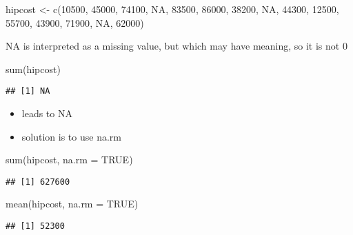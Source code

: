\documentclass[
]{book}
\newenvironment{Shaded}{\begin{snugshade}}{\end{snugshade}}
\newcommand{\AttributeTok}[1]{\textcolor[rgb]{0.77,0.63,0.00}{#1}}
\newcommand{\ConstantTok}[1]{\textcolor[rgb]{0.00,0.00,0.00}{#1}}
\newcommand{\DecValTok}[1]{\textcolor[rgb]{0.00,0.00,0.81}{#1}}
\newcommand{\FunctionTok}[1]{\textcolor[rgb]{0.00,0.00,0.00}{#1}}
\newcommand{\NormalTok}[1]{#1}
\newcommand{\OtherTok}[1]{\textcolor[rgb]{0.56,0.35,0.01}{#1}}
\providecommand{\tightlist}{%
  \setlength{\itemsep}{0pt}\setlength{\parskip}{0pt}}
\theoremstyle{definition}
\theoremstyle{definition}
\theoremstyle{definition}
\theoremstyle{definition}
\theoremstyle{remark}
\begin{document}
\begin{Shaded}
\begin{Highlighting}[]
\NormalTok{hipcost }\OtherTok{\textless{}{-}} \FunctionTok{c}\NormalTok{(}\DecValTok{10500}\NormalTok{, }\DecValTok{45000}\NormalTok{, }\DecValTok{74100}\NormalTok{, }\ConstantTok{NA}\NormalTok{, }\DecValTok{83500}\NormalTok{, }\DecValTok{86000}\NormalTok{, }\DecValTok{38200}\NormalTok{, }\ConstantTok{NA}\NormalTok{, }\DecValTok{44300}\NormalTok{, }\DecValTok{12500}\NormalTok{, }\DecValTok{55700}\NormalTok{, }\DecValTok{43900}\NormalTok{, }\DecValTok{71900}\NormalTok{, }\ConstantTok{NA}\NormalTok{, }\DecValTok{62000}\NormalTok{)}
\end{Highlighting}
\end{Shaded}

NA is interpreted as a missing value, but which may have meaning, so it is not 0

\begin{Shaded}
\begin{Highlighting}[]
\FunctionTok{sum}\NormalTok{(hipcost)}
\end{Highlighting}
\end{Shaded}

\begin{verbatim}
## [1] NA
\end{verbatim}

\begin{itemize}
\tightlist
\item
  leads to NA
\item
  solution is to use na.rm
\end{itemize}

\begin{Shaded}
\begin{Highlighting}[]
\FunctionTok{sum}\NormalTok{(hipcost, }\AttributeTok{na.rm =} \ConstantTok{TRUE}\NormalTok{)}
\end{Highlighting}
\end{Shaded}

\begin{verbatim}
## [1] 627600
\end{verbatim}

\begin{Shaded}
\begin{Highlighting}[]
\FunctionTok{mean}\NormalTok{(hipcost, }\AttributeTok{na.rm =} \ConstantTok{TRUE}\NormalTok{)}
\end{Highlighting}
\end{Shaded}

\begin{verbatim}
## [1] 52300
\end{verbatim}
\end{document}
